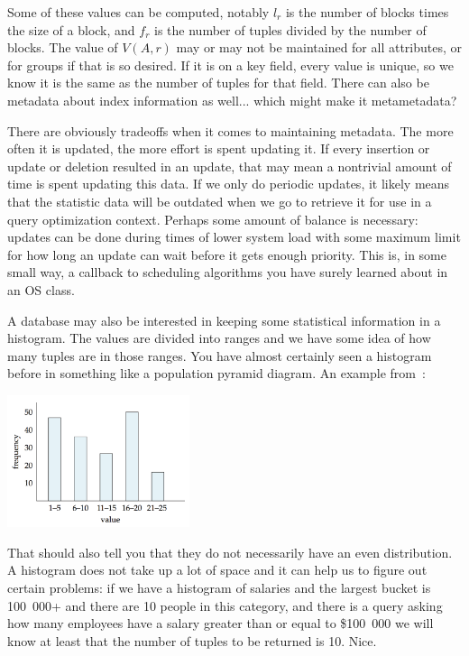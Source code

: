 \documentclass[a4paper]{report}
\begin{document}
Some of these values can be computed, notably $l_{r}$ is the number of blocks times the size of a block, and $f_{r}$ is the number of tuples divided by the number of blocks. The value of $V(A, r)$ may or may not be maintained for all attributes, or for groups if that is so desired. If it is on a key field, every value is unique, so we know it is the same as the number of tuples for that field. There can also be metadata about index information as well... which might make it metametadata? 

There are obviously tradeoffs when it comes to maintaining metadata. The more often it is updated, the more effort is spent updating it. If every insertion or update or deletion resulted in an update, that may mean a nontrivial amount of time is spent updating this data. If we only do periodic updates, it likely means that the statistic data will be outdated when we go to retrieve it for use in a query optimization context. Perhaps some amount of balance is necessary: updates can be done during times of lower system load with some maximum limit for how long an update can wait before it gets enough priority. This is, in some small way, a callback to scheduling algorithms you have surely learned about in an OS class. 

A database may also be interested in keeping some statistical information in a histogram. The values are divided into ranges and we have some idea of how many tuples are in those ranges. You have almost certainly seen a histogram before in something like a population pyramid diagram. An example from~\cite{dsc}:

\begin{center}
\includegraphics[width=0.4\textwidth]{images/histogram}
\end{center}

That should also tell you that they do not necessarily have an even distribution. A histogram does not take up a lot of space and it can help us to figure out certain problems: if we have a histogram of salaries and the largest bucket is 100~000+ and there are 10 people in this category, and there is a query asking how many employees have a salary greater than or equal to \$100~000 we will know at least that the number of tuples to be returned is 10. Nice.
\end{document}
